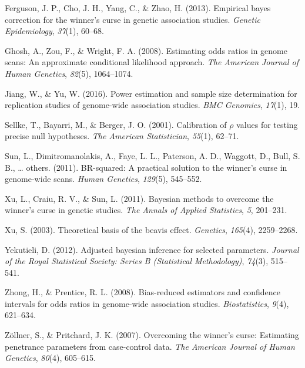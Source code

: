 \documentclass[12pt,twoside]{dukestatscithesis}
\theoremstyle{definition}
\theoremstyle{definition}
\theoremstyle{definition}
\theoremstyle{remark}
\begin{document}
\hypertarget{ref-ferguson2013empirical}{}
Ferguson, J. P., Cho, J. H., Yang, C., \& Zhao, H. (2013). Empirical
bayes correction for the winner's curse in genetic association studies.
\emph{Genetic Epidemiology}, \emph{37}(1), 60--68.

\hypertarget{ref-ghosh2008estimating}{}
Ghosh, A., Zou, F., \& Wright, F. A. (2008). Estimating odds ratios in
genome scans: An approximate conditional likelihood approach. \emph{The
American Journal of Human Genetics}, \emph{82}(5), 1064--1074.

\hypertarget{ref-jiang2016power}{}
Jiang, W., \& Yu, W. (2016). Power estimation and sample size
determination for replication studies of genome-wide association
studies. \emph{BMC Genomics}, \emph{17}(1), 19.

\hypertarget{ref-sellke2001calibration}{}
Sellke, T., Bayarri, M., \& Berger, J. O. (2001). Calibration of
\(\rho\) values for testing precise null hypotheses. \emph{The American
Statistician}, \emph{55}(1), 62--71.

\hypertarget{ref-sun2011br}{}
Sun, L., Dimitromanolakis, A., Faye, L. L., Paterson, A. D., Waggott,
D., Bull, S. B., \ldots{} others. (2011). BR-squared: A practical
solution to the winner's curse in genome-wide scans. \emph{Human
Genetics}, \emph{129}(5), 545--552.

\hypertarget{ref-xu2011bayesian}{}
Xu, L., Craiu, R. V., \& Sun, L. (2011). Bayesian methods to overcome
the winner's curse in genetic studies. \emph{The Annals of Applied
Statistics}, \emph{5}, 201--231.

\hypertarget{ref-xu2003theoretical}{}
Xu, S. (2003). Theoretical basis of the beavis effect. \emph{Genetics},
\emph{165}(4), 2259--2268.

\hypertarget{ref-yekutieli2012adjusted}{}
Yekutieli, D. (2012). Adjusted bayesian inference for selected
parameters. \emph{Journal of the Royal Statistical Society: Series B
(Statistical Methodology)}, \emph{74}(3), 515--541.

\hypertarget{ref-zhong2008bias}{}
Zhong, H., \& Prentice, R. L. (2008). Bias-reduced estimators and
confidence intervals for odds ratios in genome-wide association studies.
\emph{Biostatistics}, \emph{9}(4), 621--634.

\hypertarget{ref-zollner2007overcoming}{}
Zöllner, S., \& Pritchard, J. K. (2007). Overcoming the winner's curse:
Estimating penetrance parameters from case-control data. \emph{The
American Journal of Human Genetics}, \emph{80}(4), 605--615.


\end{document}

